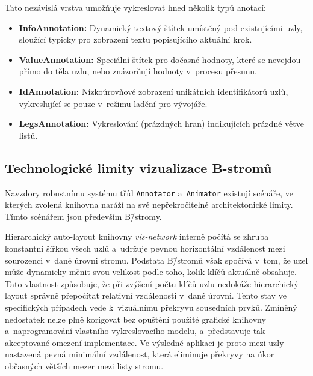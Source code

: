 \begin{listing}[ht]
    \inputminted{typescript}{code/implementation/annotator.ts}
    \caption{Napojení vlastní vrstvy DataStructureAnnotator na událost vykreslení sítě}
    \label{code:annotator_redraw}
\end{listing}

Tato nezávislá vrstva umožňuje vykreslovat hned několik typů anotací:
\begin{itemize}
    \item \textbf{InfoAnnotation:} Dynamický textový štítek umístěný pod existujícími uzly, sloužící typicky pro zobrazení textu popisujícího aktuální krok.
    \item \textbf{ValueAnnotation:} Speciální štítek pro dočasné hodnoty, které se nevejdou přímo do těla uzlu, nebo znázorňují hodnoty v~procesu přesunu.
    \item \textbf{IdAnnotation:} Nízkoúrovňové zobrazení unikátních identifikátorů uzlů, vykreslující se pouze v~režimu ladění pro vývojáře.
    \item \textbf{LegsAnnotation:} Vykreslování  (prázdných hran) indikujících prázdné větve listů.
\end{itemize}

\subsection{Technologické limity vizualizace B-stromů}
\label{subsec:btree-limitations}

Navzdory robustnímu systému tříd \texttt{Annotator} a~\texttt{Animator} existují scénáře, ve kterých zvolená knihovna naráží na své nepřekročitelné architektonické limity.
Tímto scénářem jsou především B\=/stromy.

Hierarchický auto-layout knihovny \textit{vis-network} interně počítá se zhruba konstantní šířkou všech uzlů a~udržuje pevnou horizontální vzdálenost mezi sourozenci v~dané úrovni stromu.
Podstata B\=/stromů však spočívá v~tom, že uzel může dynamicky měnit svou velikost podle toho, kolik klíčů aktuálně obsahuje.
Tato vlastnost způsobuje, že při zvýšení počtu klíčů uzlu nedokáže hierarchický layout správně přepočítat relativní vzdálenosti v~dané úrovni.
Tento stav ve specifických případech vede k~vizuálnímu překryvu sousedních prvků.
Zmíněný nedostatek nelze plně korigovat bez opuštění použité grafické knihovny a~naprogramování vlastního vykreslovacího modelu, a~představuje tak akceptované omezení implementace.
Ve výsledné aplikaci je proto mezi uzly nastavená pevná minimální vzdálenost, která eliminuje překryvy na úkor občasných větších mezer mezi listy stromu.

